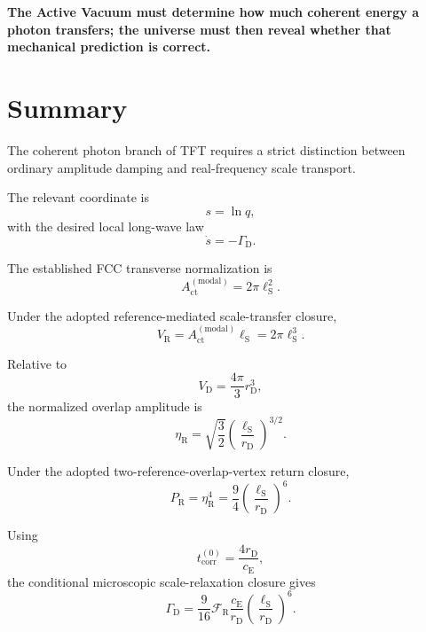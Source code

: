 \medskip
\noindent\textbf{The Active Vacuum must determine
how much coherent energy a photon transfers;
the universe must then reveal whether that
mechanical prediction is correct.}


\section{Summary}

The coherent photon branch of TFT requires a strict distinction between
ordinary amplitude damping and real-frequency scale transport.

The relevant coordinate is
\begin{equation}
    s=\ln q,
\end{equation}
with the desired local long-wave law
\begin{equation}
    \dot s
    =
    -\Gamma_{\mathrm D}.
\end{equation}

The established FCC transverse normalization is
\begin{equation}
    A_{\mathrm{ct}}^{(\mathrm{modal})}
    =
    2\pi\ell_{\mathrm S}^{2}.
\end{equation}

Under the adopted reference-mediated scale-transfer closure,
\begin{equation}
    V_{\mathrm R}
    =
    A_{\mathrm{ct}}^{(\mathrm{modal})}
    \ell_{\mathrm S}
    =
    2\pi\ell_{\mathrm S}^{3}.
\end{equation}

Relative to
\begin{equation}
    V_{\mathrm D}
    =
    \frac{4\pi}{3}
    r_{\mathrm D}^{3},
\end{equation}
the normalized overlap amplitude is
\begin{equation}
    \eta_{\mathrm R}
    =
    \sqrt{\frac32}
    \left(
        \frac{
            \ell_{\mathrm S}
        }{
            r_{\mathrm D}
        }
    \right)^{3/2}.
\end{equation}

Under the adopted two-reference-overlap-vertex return closure,
\begin{equation}
    P_{\mathrm R}
    =
    \eta_{\mathrm R}^{4}
    =
    \frac94
    \left(
        \frac{
            \ell_{\mathrm S}
        }{
            r_{\mathrm D}
        }
    \right)^6.
\end{equation}

Using
\begin{equation}
    t_{\mathrm{corr}}^{(0)}
    =
    \frac{
        4r_{\mathrm D}
    }{
        c_{\mathrm E}
    },
\end{equation}
the conditional microscopic scale-relaxation closure gives
\begin{equation}
    \Gamma_{\mathrm D}
    =
    \frac{9}{16}
    \mathcal F_{\mathrm R}
    \frac{
        c_{\mathrm E}
    }{
        r_{\mathrm D}
    }
    \left(
        \frac{
            \ell_{\mathrm S}
        }{
            r_{\mathrm D}
        }
    \right)^6.
\end{equation}

